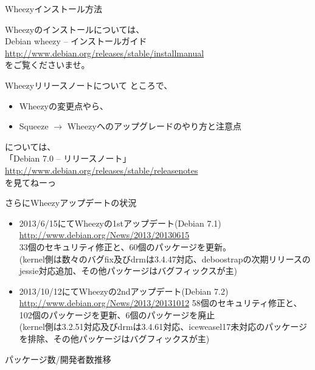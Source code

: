 \begin{frame}{Wheezyインストール方法}

Wheezyのインストールについては、\\
Debian wheezy -- インストールガイド\\
\url{http://www.debian.org/releases/stable/installmanual}\\
をご覧くださいませ。
\end{frame}

\begin{frame}{Wheezyリリースノートについて}
ところで、
\begin{itemize}
\item Wheezyの変更点やら、
\item Squeeze $\rightarrow$ Wheezyへのアップグレードのやり方と注意点
\end{itemize}
については、\\
「Debian 7.0 -- リリースノート」\\
\url{http://www.debian.org/releases/stable/releasenotes}\\
を見てねーっ
\end{frame}

\begin{frame}{さらにWheezyアップデートの状況}

\begin{itemize}
\item 2013/6/15にてWheezyの1stアップデート(Debian 7.1)\\
\url{http://www.debian.org/News/2013/20130615}\\
33個のセキュリティ修正と、60個のパッケージを更新。\\
(kernel側は数々のバグfix及びdrmは3.4.47対応、deboostrapの次期リリースのjessie対応追加、その他パッケージはバグフィックスが主)
\item 2013/10/12にてWheezyの2ndアップデート(Debian 7.2)\\
\url{http://www.debian.org/News/2013/20131012}
58個のセキュリティ修正と、102個のパッケージを更新、6個のパッケージを廃止\\
(kernel側は3.2.51対応及びdrmは3.4.61対応、iceweasel17未対応のパッケージを排除、その他パッケージはバグフィックスが主)
\end{itemize}

\end{frame}

\begin{frame}
\begin{center}
\LARGE
パッケージ数/開発者数推移
\end{center}
\end{frame}

